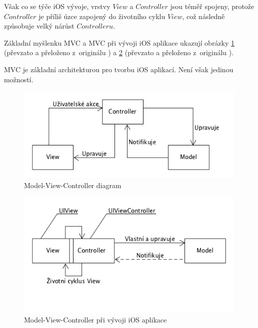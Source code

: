 \documentclass[thesis=M,czech]{FITthesis}[2012/06/26]
\begin{document}
Však co se týče iOS vývoje, vrstvy $View$ a $Controller$ jsou téměř spojeny, protože $Controller$ je příliš úzce zapojený do životního cyklu $View$, což následně způsobuje velký nárůst $Controlleru$.\cite{Orlov}

Základní myšlenku MVC a MVC při vývoji iOS aplikace ukazují obrázky \ref{fig:mvc} (převzato a přeloženo z~originálu \cite{mvc-pic}) a \ref{fig:mvc-apple} (převzato a přeloženo z~originálu \cite{mvc-apple-pic}).

MVC je základní architekturou pro tvorbu iOS aplikací. Není však jedinou možností.

\begin{figure}[h]\centering
 \includegraphics[width=0.99\textwidth]{./pictures/architektury/model_view_controller}
 \caption[Model-View-Controller diagram]{Model-View-Controller diagram}\label{fig:mvc}
\end{figure}

\begin{figure}[h]\centering
 \includegraphics[width=0.99\textwidth]{./pictures/architektury/appleMVC}
 \caption[Model-View-Controller při vývoji iOS aplikace]{Model-View-Controller při vývoji iOS aplikace}\label{fig:mvc-apple}
\end{figure}
\end{document}
